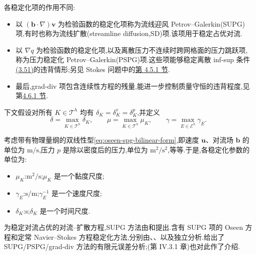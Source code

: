 \begin{note}[各稳定化项的作用]\label{note:oseen-spg-term-roles}
各稳定化项的作用不同:
\begin{itemize}
  \item 以 $(\bm{b}\cdot\nabla)\bm{v}$ 为检验函数的稳定化项称为流线迎风 Petrov--Galerkin(SUPG)项,有时也称为流线扩散(streamline diffusion,SD)项.该项用于稳定占优对流.
  \item 以 $\nabla q$ 为检验函数的稳定化项,以及离散压力不连续时跨网格面的压力跳跃项,称为压力稳定化 Petrov--Galerkin(PSPG)项.这些项能够稳定离散 inf-sup 条件\hyperref[eq:discrete-infsup-condition]{(3.51)}的违背情形;另见 Stokes 问题中的\hyperref[sec:stokes-pspg]{第 4.5.1 节}.
  \item 最后,grad-div 项包含连续性方程的残量,能进一步控制质量守恒的违背程度,见第\hyperref[sec:stokes-grad-div-stabilization]{4.6.1 节}.
\end{itemize}
\end{note}

\begin{note}[稳定化参数]\label{note:oseen-spg-parameters}
下文假设对所有 $K\in\mathcal{T}^h$ 均有 $\delta_K=\delta_K^v=\delta_K^p$,并定义
\begin{equation}\label{eq:oseen-spg-global-parameters}
  \delta=\max_{K\in\mathcal{T}^h}\delta_K,
  \qquad
  \mu=\max_{K\in\mathcal{T}^h}\mu_K,
  \qquad
  \gamma=\max_{E\in\mathcal{E}^h}\gamma_E.
\end{equation}
\end{note}

\begin{note}[稳定化参数的量纲]\label{note:oseen-spg-parameter-dimensions}
考虑带有物理量纲的双线性型\cref{eq:oseen-spg-bilinear-form},即速度 $\bm{u}$、对流场 $\bm{b}$ 的单位为 $\mathrm{m}/\mathrm{s}$,压力 $p$ 是除以密度后的压力,单位为 $\mathrm{m}^2/\mathrm{s}^2$,等等.于是,各稳定化参数的单位为:
\begin{itemize}
  \item $\mu_K$:$\mathrm{m}^2/\mathrm{s}$;$\mu_K$ 是一个黏度尺度;
  \item $\gamma_E$:$\mathrm{s}/\mathrm{m}$;$\gamma_E^{-1}$ 是一个速度尺度;
  \item $\delta_K$:$\mathrm{s}$;$\delta_K$ 是一个时间尺度.
\end{itemize}
\end{note}

\begin{note}\label{note:oseen-spg-history}
为稳定对流占优的对流--扩散方程,SUPG 方法由\textcite{HughesBrooks1979}和\textcite{BrooksHughes1982}提出.含有 SUPG 项的 Oseen 方程和定常 Navier--Stokes 方程稳定化方法,分别由\textcite{HansboSzepessy1990}、\textcite{LubeTobiska1990}、\textcite{TobiskaLube1991}以及\textcite{FrancaFrey1992}独立分析.\textcite{TobiskaVerfuerth1996}给出了 SUPG/PSPG/grad-div 方法的有限元误差分析;\textcite{RoosStynesTobiska2008}(第 IV.3.1 章)也对此作了介绍.
\end{note}

